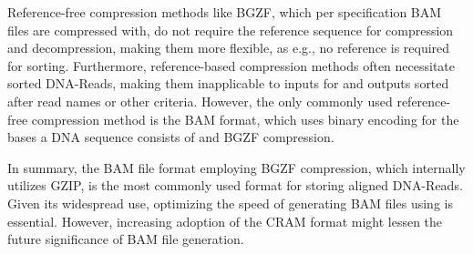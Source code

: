 Reference-free compression methods like BGZF, which per specification BAM files are compressed with, do not require the reference sequence for compression and decompression, making them more flexible, as e.g., no reference is required for sorting. Furthermore, reference-based compression methods often necessitate sorted DNA-Reads, making them inapplicable to inputs for \sort and outputs sorted after read names or other criteria. However, the only commonly used reference-free compression method is the BAM format, which uses binary encoding for the bases a DNA sequence consists of and BGZF compression. 

In summary, the BAM file format employing BGZF compression, which internally utilizes GZIP, is the most commonly used format for storing aligned DNA-Reads. Given its widespread use, optimizing the speed of generating BAM files using \sort is essential. However, increasing adoption of the CRAM format might lessen the future significance of BAM file generation.

